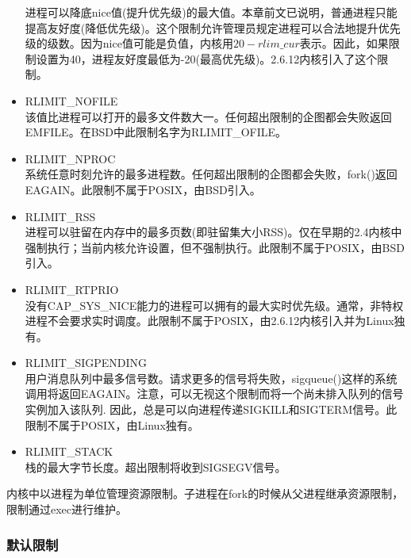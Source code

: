 \begin{itemize}{}
  进程可以降底nice值(提升优先级)的最大值。本章前文已说明，普通进程只能提高友好度(降低优先级)。这个限制允许管理员规定进程可以合法地提升优先级的级数。因为nice值可能是负值，内核用$20-rlim\_cur$表示。因此，如果限制设置为40，进程友好度最低为-20(最高优先级)。2.6.12内核引入了这个限制。
\item RLIMIT\_NOFILE\\
  该值比进程可以打开的最多文件数大一。任何超出限制的企图都会失败返回EMFILE。在BSD中此限制名字为RLIMIT\_OFILE。
\item RLIMIT\_NPROC\\
  系统任意时刻允许的最多进程数。任何超出限制的企图都会失败，fork()返回EAGAIN。此限制不属于POSIX，由BSD引入。
\item RLIMIT\_RSS\\
  进程可以驻留在内存中的最多页数(即驻留集大小RSS)。仅在早期的2.4内核中强制执行；当前内核允许设置，但不强制执行。此限制不属于POSIX，由BSD引入。
\item RLIMIT\_RTPRIO\\
  没有CAP\_SYS\_NICE能力的进程可以拥有的最大实时优先级。通常，非特权进程不会要求实时调度。此限制不属于POSIX，由2.6.12内核引入并为Linux独有。
\item RLIMIT\_SIGPENDING\\
  用户消息队列中最多信号数。请求更多的信号将失败，sigqueue()这样的系统调用将返回EAGAIN。注意，可以无视这个限制而将一个尚未排入队列的信号实例加入该队列. 因此，总是可以向进程传递SIGKILL和SIGTERM信号。此限制不属于POSIX，由Linux独有。
\item RLIMIT\_STACK\\
  栈的最大字节长度。超出限制将收到SIGSEGV信号。
\end{itemize}


内核中以进程为单位管理资源限制。子进程在fork的时候从父进程继承资源限制，限制通过exec进行维护。

\subsubsection{默认限制}

